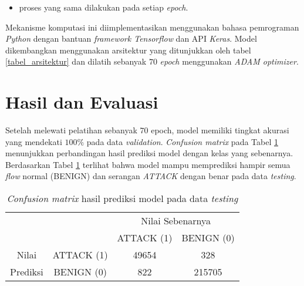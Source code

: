 \documentclass[a4paper,12pt]{report}
\begin{document}
\begin{itemize}
\begin{itemize}
\begin{itemize}
\begin{enumerate}
				\item Nilai aktivasi pada setiap \textit{neuron} di \textit{layer} ke-2 ($A_2$) akan dhitung dengan cara yang sama dengan perhitungan $A_1$. Begitu juga untuk \textit{layer} ke-3 dan ke-4 dengan mempertimbangkan fungsi aktivasi pada setiap \textit{layer}
				
			\end{enumerate} 
				
			\item Proses komputasi yang sama dilakukan pada data berikutnya sampai data terakhir pada \textit{batch} tersebut. Kemudian, akan dihitung \textit{loss function} yang diperoleh. \textit{Loss function} ini akan digunakan untuk mengoptimalkan nilai parameter $\mathbf{W}_{1}, \mathbf{W}_{2}, \mathbf{W}_{3}$ dan $\mathbf{W}_{4}$.
		\end{itemize}
		\item Proses komputasi yang sama dilakukan hingga \textit{batch} terakhir.
	\end{itemize}
	\item proses yang sama dilakukan pada setiap \textit{epoch}.
\end{itemize}

Mekanisme komputasi ini diimplementasikan menggunakan bahasa pemrograman \textit{Python} dengan bantuan \textit{framework Tensorflow} dan API \textit{Keras}. Model dikembangkan menggunakan arsitektur yang ditunjukkan oleh tabel \ref{tabel_arsitektur} dan dilatih sebanyak $70$ \textit{epoch} menggunakan \textit{ADAM optimizer}.

\section{Hasil dan Evaluasi}
Setelah melewati pelatihan sebanyak $70$ epoch, model memiliki tingkat akurasi yang mendekati $100\%$ pada data \textit{validation}. \textit{Confusion matrix} pada Tabel \ref{conf_mat_hasil} menunjukkan perbandingan hasil prediksi model dengan kelas yang sebenarnya. Berdasarkan Tabel \ref{conf_mat_hasil} terlihat bahwa model mampu memprediksi hampir semua \textit{flow} normal (BENIGN) dan serangan \textit{ATTACK} dengan benar pada data \textit{testing}. 

\begin{table}[!h]
	\centering
	\caption{\textit{Confusion matrix} hasil prediksi model pada data \textit{testing}}
	\label{conf_mat_hasil}
	\begin{tabular}{|c|c|c|c|}
		\hline
		\multicolumn{2}{|c|}{} & \multicolumn{2}{|c|}{Nilai Sebenarnya} \\
		\cline{3-4}
		\multicolumn{2}{|c|}{} & ATTACK (1) & BENIGN (0) \\
		\hline
		Nilai & ATTACK (1) & 49654 & 328 \\
		\cline{2-4}
		Prediksi & BENIGN (0) & 822 & 215705 \\
		\hline
	\end{tabular}
\end{table}
\end{document}
